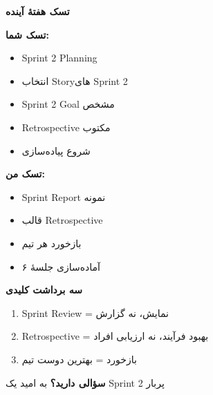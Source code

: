 \documentclass[14pt, a4paper, landscape]{extarticle}
\newcommand{\slide}[1]{%
    \newpage
    \begin{center}
    \begin{minipage}[t]{0.95\textwidth}
    \vspace{0.5cm}
    #1
    \vspace{0.5cm}
    \end{minipage}
    \end{center}
}
\newcommand{\slidetitle}[1]{%
    \begin{center}
        {\LARGE\bfseries\textcolor{primary}{#1}}
    \end{center}
    \vspace{0.5cm}
}
\newcommand{\myaccent}[1]{\textcolor{accent}{#1}}
\begin{document}
\slide{
    \slidetitle{تسک هفتهٔ آینده}
    \vspace{0.5cm}
    \begin{minipage}[t]{0.48\textwidth}
        {\bfseries\textcolor{primary}{تسک شما:}}
        \vspace{0.3cm}
        \begin{itemize}[itemsep=0.3em]
            \item Sprint 2 Planning
            \item انتخاب Storyهای Sprint 2
            \item Sprint 2 Goal مشخص
            \item Retrospective مکتوب
            \item شروع پیاده‌سازی
        \end{itemize}
    \end{minipage}
    \hfill
    \begin{minipage}[t]{0.48\textwidth}
        {\bfseries\myaccent{تسک من:}}
        \vspace{0.3cm}
        \begin{itemize}[itemsep=0.3em]
            \item Sprint Report نمونه
            \item قالب Retrospective
            \item بازخورد هر تیم
            \item آماده‌سازی جلسهٔ ۶
        \end{itemize}
    \end{minipage}
}

\slide{
    \slidetitle{سه برداشت کلیدی}
    \vspace{1cm}
    \begin{enumerate}[itemsep=0.8em]
        \item {\large Sprint Review = نمایش، نه گزارش}
        \item {\large Retrospective = بهبود فرآیند، نه ارزیابی افراد}
        \item {\large بازخورد = بهترین دوست تیم}
    \end{enumerate}
}

\slide{
    \begin{center}
        \vspace{3cm}
        {\Huge\bfseries سؤالی دارید؟}
        \vspace{1.5cm}
        {\LARGE\myaccent{به امید یک Sprint 2 پربار}}
    \end{center}
}
\end{document}
